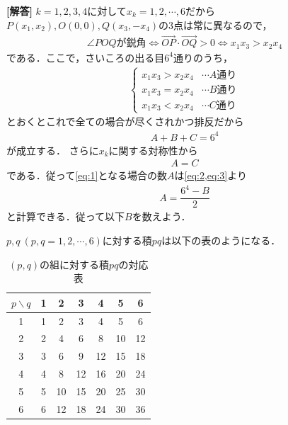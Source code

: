 \documentclass[../../main.tex]{subfiles}
\begin{document}
\begin{oframed}
  
\end{oframed}

{\bf [解答]}
$k=1,2,3,4$に対して$x_k=1,2,\cdots,6$だから$P(x_1,x_2),O(0,0),Q(x_3,-x_4)$の3点は常に異なるので，
\begin{align}
  \angle POQ\text{が鋭角} \iff \overrightarrow{OP}\cdot\overrightarrow{OQ}>0 \iff x_1x_3>x_2x_4 \label{eq:1}
\end{align}
である．ここで，さいころの出る目$6^4$通りのうち，
\begin{align}
  \begin{cases}\displaystyle
    x_1x_3>x_2x_4 & \cdots A\text{通り} \\
    x_1x_3=x_2x_4 & \cdots B\text{通り} \\
    x_1x_3<x_2x_4 & \cdots C\text{通り}
  \end{cases}
\end{align}
とおくとこれで全ての場合が尽くされかつ排反だから
\begin{align}
  A+B+C=6^4 \label{eq:2}
\end{align}
が成立する．
さらに$x_k$に関する対称性から
\begin{align}
  A = C \label{eq:3}
\end{align}
である．従って\cref{eq:1}となる場合の数$A$は\cref{eq:2,eq:3}より
\begin{align}
  A = \dfrac{6^4-B}{2} \label{eq:4}
\end{align}
と計算できる．従って以下$B$を数えよう．

$p,q\ (p,q=1,2,\cdots,6)$に対する積$pq$は以下の表のようになる．
\begin{table}[htb]
  \centering
  \caption{$(p,q)$の組に対する積$pq$の対応表}
  \begin{tabular}{c|cccccc}
    $p\backslash q$ & 1 & 2 & 3 & 4 & 5 & 6 \\
    \hline
    1 & 1 & 2 & 3 & 4 & 5 & 6 \\
    2 & 2 & 4 & 6 & 8 & 10 & 12 \\
    3 & 3 & 6 & 9 & 12 & 15 & 18 \\
    4 & 4 & 8 & 12 & 16 & 20 & 24 \\
    5 & 5 & 10 & 15 & 20 & 25 & 30 \\
    6 & 6 & 12 & 18 & 24 & 30 & 36
  \end{tabular}
\end{table}
\end{document}
